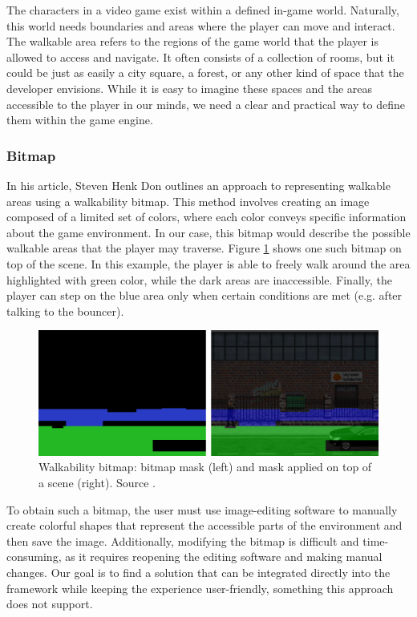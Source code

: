 The characters in a video game exist within a defined in-game world. Naturally, this world needs boundaries and areas where the player can move and interact. The walkable area refers to the regions of the game world that the player is allowed to access and navigate. It often consists of a collection of rooms, but it could be just as easily a city square, a forest, or any other kind of space that the developer envisions. While it is easy to imagine these spaces and the areas accessible to the player in our minds, we need a clear and practical way to define them within the game engine. 

\subsubsection{Bitmap}
In his article, Steven Henk Don \cite{Shdon} outlines an approach to representing walkable areas using a walkability bitmap. This method involves creating an image composed of a limited set of colors, where each color conveys specific information about the game environment. In our case, this bitmap would describe the possible walkable areas that the player may traverse. Figure \ref{fig:WS:Bitmap} shows one such bitmap on top of the scene. In this example, the player is able to freely walk around the area highlighted with green color, while the dark areas are inaccessible. Finally, the player can step on the blue area only when certain conditions are met (e.g. after talking to the bouncer).  

\begin{figure}[H]
\centering
\includegraphics[width=1.0\linewidth]{img/walkability-map2.png}
\caption{Walkability bitmap: bitmap mask (left) and mask applied on top of a scene (right). Source \cite{Shdon}.}
\label{fig:WS:Bitmap}
\end{figure}

To obtain such a bitmap, the user must use image-editing software to manually create colorful shapes that represent the accessible parts of the environment and then save the image. Additionally, modifying the bitmap is difficult and time-consuming, as it requires reopening the editing software and making manual changes. Our goal is to find a solution that can be integrated directly into the framework while keeping the experience user-friendly, something this approach does not support. 

